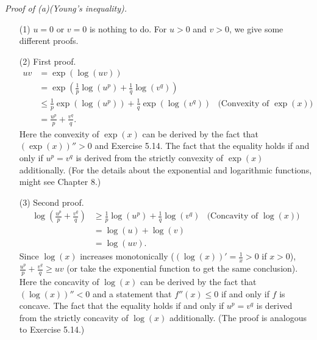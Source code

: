 \documentclass{article}
\begin{document}
\emph{Proof of (a)(Young's inequality).}
\begin{enumerate}
  \item[(1)]
  $u = 0$ or $v = 0$ is nothing to do.
  For $u > 0$ and $v > 0$, we give some different proofs.

  \item[(2)]
  First proof.
  \begin{align*}
    uv
    &= \exp(\log(uv)) \\
    &= \exp(\frac{1}{p}\log(u^p) + \frac{1}{q}\log(v^q)) \\
    &\leq \frac{1}{p} \exp(\log(u^p)) + \frac{1}{q}\exp(\log(v^q))
      &\text{(Convexity of $\exp(x)$)} \\
    &= \frac{u^p}{p} + \frac{v^q}{q}.
  \end{align*}
  Here the convexity of $\exp(x)$ can be derived
  by the fact that $(\exp(x))'' > 0$ and Exercise 5.14.
  The fact that the equality holds if and only if $u^p = v^q$
  is derived from the strictly convexity of $\exp(x)$ additionally.
  (For the details about the exponential and logarithmic functions,
  might see Chapter 8.)

  \item[(3)]
  Second proof.
  \begin{align*}
    \log(\frac{u^p}{p} + \frac{v^q}{q})
    &\geq \frac{1}{p} \log(u^p) + \frac{1}{q}\log(v^q)
      &\text{(Concavity of $\log(x)$)} \\
    &= \log(u) + \log(v) \\
    &= \log(uv).
  \end{align*}
  Since $\log(x)$ increases monotonically ($(\log(x))' = \frac{1}{x} > 0$ if $x > 0$),
  $\frac{u^p}{p} + \frac{v^q}{q} \geq uv$
  (or take the exponential function to get the same conclusion).
  Here the concavity of $\log(x)$ can be derived
  by the fact that $(\log(x))'' < 0$ and a statement that
  $f''(x) \leq 0$ if and only if $f$ is concave.
  The fact that the equality holds if and only if $u^p = v^q$
  is derived from the strictly concavity of $\log(x)$ additionally.
  (The proof is analogous to Exercise 5.14.)


\end{enumerate}
\end{document}
